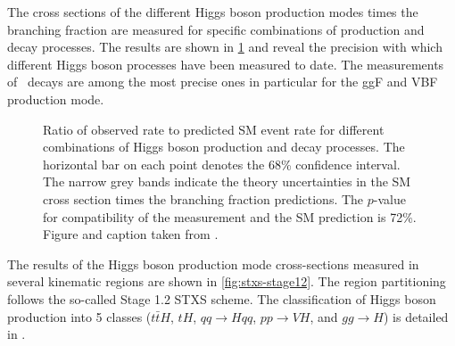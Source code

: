 The cross sections of the different Higgs boson production modes times the branching fraction are measured for specific combinations of production and decay processes. 
The results are shown in \cref{fig:prod-per-channel} and reveal the precision with which different Higgs boson processes have been measured to date. 
The measurements of \HWW\ decays are among the most precise ones in particular for the ggF and VBF production mode.
\begin{figure}
  \caption{Ratio of observed rate to predicted SM event rate for different combinations of
  Higgs boson production and decay processes. The horizontal bar on each point denotes the 68\% confidence interval. The narrow grey bands indicate the theory uncertainties in the SM cross section times the branching
fraction predictions. The $p$-value for compatibility of the measurement and the SM prediction is
72\%. Figure and caption taken from .}
  \label{fig:prod-per-channel}
\end{figure}
The results of the Higgs boson production mode cross-sections measured in several kinematic regions are shown in \cref{fig:stxs-stage12}. The region partitioning follows the so-called Stage 1.2 STXS scheme. 
The classification of Higgs boson production into 5 classes ($t\bar{t}H$, $tH$, $qq\to Hqq$, $pp\to VH$, and $gg\to H$) is detailed in \cite{NaturePaper}. 
